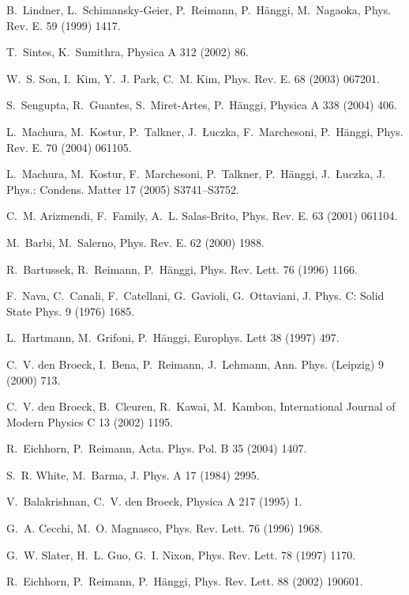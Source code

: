 \documentclass{elsart}
\begin{document}
\begin{thebibliography}{99}
B.~Lindner, L.~Schimansky-Geier, P.~Reimann, P.~H\"anggi, M.~Nagaoka, Phys.
  Rev. E. 59 (1999) 1417.

T.~Sintes, K.~Sumithra, Physica A 312 (2002) 86.

W.~S. Son, I.~Kim, Y.~J. Park,  C.~M. Kim, Phys. Rev. E. 68 (2003)
067201.


S.~Sengupta, R.~Guantes, S.~Miret-Artes, P.~H\"anggi, Physica A 338
(2004) 406.

L.~Machura, M.~Kostur, P.~Talkner, J.~{\L}uczka, F.~Marchesoni, P.~H\"anggi,
  Phys. Rev. E. 70 (2004) 061105.

L.~Machura, M.~Kostur, F.~Marchesoni, P.~Talkner, P.~H\"anggi, J.~{\L}uczka, J.
  Phys.: Condens. Matter 17 (2005) S3741--S3752.

C.~M. Arizmendi, F.~Family, A.~L. Salas-Brito, Phys. Rev. E. 63 (2001) 061104.

M.~Barbi, M.~Salerno, Phys. Rev. E. 62 (2000) 1988.

R.~Bartussek, R.~Reimann, P.~H\"anggi, Phys. Rev. Lett. 76 (1996) 1166.

F.~Nava, C.~Canali, F.~Catellani, G.~Gavioli, G.~Ottaviani, J. Phys. C: Solid
  State Phys. 9 (1976) 1685.

L.~Hartmann, M.~Grifoni, P.~H\"anggi, Europhys. Lett 38 (1997) 497.

C.~V. den Broeck, I.~Bena, P.~Reimann, J.~Lehmann, Ann. Phys. (Leipzig) 9
  (2000) 713.

C.~V. den Broeck, B.~Cleuren, R.~Kawai, M.~Kambon, International Journal of
  Modern Physics C 13 (2002) 1195.

R.~Eichhorn, P.~Reimann, Acta. Phys. Pol. B 35 (2004) 1407.

S.~R. White, M.~Barma, J. Phys. A 17 (1984) 2995.

V.~Balakrishnan, C.~V. den Broeck, Physica A 217 (1995) 1.

G.~A. Cecchi, M.~O. Magnasco, Phys. Rev. Lett. 76 (1996) 1968.

G.~W. Slater, H.~L. Guo, G.~I. Nixon, Phys. Rev. Lett. 78 (1997) 1170.

R.~Eichhorn, P.~Reimann, P.~H\"anggi, Phys. Rev. Lett. 88 (2002) 190601.


\end{thebibliography}
\end{document}
